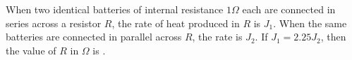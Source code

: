 
\item When two identical batteries of internal resistance \(1 \Omega\) each are connected in series across a resistor \(R\), the rate of heat produced in \(R\) is \(J_1\). When the same batteries are connected in parallel across \(R\), the rate is \(J_2\). If \(J_1 = 2.25 J_2\), then the value of \(R\) in \(\Omega\) is \underline{\hspace{2.5cm}}.
